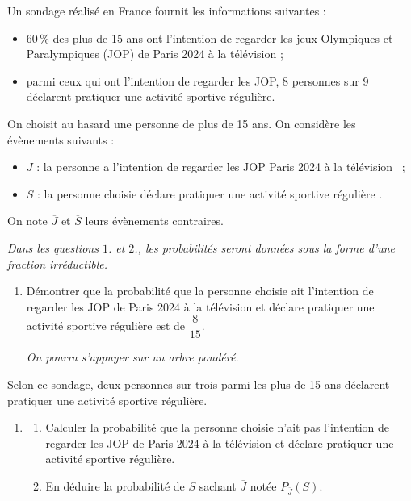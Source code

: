 \medskip

Un sondage réalisé en France fournit les informations suivantes :

\begin{itemize}[label=$\bullet~$]
\item 60\,\% des plus de 15 ans ont l'intention de regarder les jeux Olympiques et Paralympiques (JOP) de Paris 2024 à la télévision ;
\item parmi ceux qui ont l'intention de regarder les JOP, 8 personnes sur 9 déclarent pratiquer une activité sportive régulière.
\end{itemize}

On choisit au hasard une personne de plus de 15 ans. On considère les évènements suivants :

\begin{itemize}[label=$\bullet~$]
\item $J$ : \og la personne a l'intention de regarder les JOP Paris 2024 à la télévision \fg\ ;
\item $S$ : \og la personne choisie déclare pratiquer une activité sportive régulière \fg.
\end{itemize}

On note $\overline{J}$ et $\overline{S}$ leurs évènements contraires.

\smallskip

\emph{Dans les questions $1$. et $2$., les probabilités seront données sous la forme d'une fraction irréductible.}

\medskip

\begin{enumerate}
	\item Démontrer que la probabilité que la personne choisie ait l'intention de regarder les JOP de Paris 2024 à la télévision et déclare pratiquer une activité sportive régulière est de $\dfrac{8}{15}$.
	
\emph{On pourra s'appuyer sur un arbre pondéré.}
\end{enumerate}

Selon ce sondage, deux personnes sur trois parmi les plus de 15 ans déclarent pratiquer une activité sportive régulière.

\begin{enumerate}[resume]
\item 
	\begin{enumerate}
		\item Calculer la probabilité que la personne choisie n'ait pas l'intention de regarder les JOP de Paris 2024 à la télévision et déclare pratiquer une activité sportive régulière.
		\item En déduire la probabilité de $S$ sachant $\overline{J}$ notée $P_{\overline{J}}(S)$.
	\end{enumerate}
\end{enumerate}

